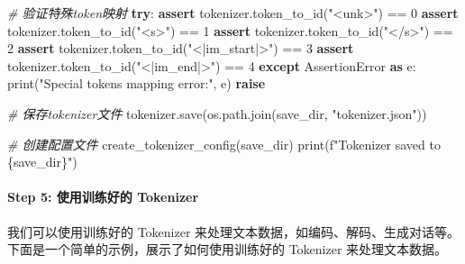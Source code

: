 \documentclass[
]{article}
\newenvironment{Shaded}{}{}
\newcommand{\BuiltInTok}[1]{\textcolor[rgb]{0.00,0.50,0.00}{#1}}
\newcommand{\CommentTok}[1]{\textcolor[rgb]{0.38,0.63,0.69}{\textit{#1}}}
\newcommand{\ControlFlowTok}[1]{\textcolor[rgb]{0.00,0.44,0.13}{\textbf{#1}}}
\newcommand{\DecValTok}[1]{\textcolor[rgb]{0.25,0.63,0.44}{#1}}
\newcommand{\ImportTok}[1]{\textcolor[rgb]{0.00,0.50,0.00}{\textbf{#1}}}
\newcommand{\NormalTok}[1]{#1}
\newcommand{\OperatorTok}[1]{\textcolor[rgb]{0.40,0.40,0.40}{#1}}
\newcommand{\PreprocessorTok}[1]{\textcolor[rgb]{0.74,0.48,0.00}{#1}}
\newcommand{\SpecialCharTok}[1]{\textcolor[rgb]{0.25,0.44,0.63}{#1}}
\newcommand{\SpecialStringTok}[1]{\textcolor[rgb]{0.73,0.40,0.53}{#1}}
\newcommand{\StringTok}[1]{\textcolor[rgb]{0.25,0.44,0.63}{#1}}
\begin{document}
\begin{Shaded}
\begin{Highlighting}[]
    \CommentTok{\# 验证特殊token映射}
    \ControlFlowTok{try}\NormalTok{:}
        \ControlFlowTok{assert}\NormalTok{ tokenizer.token\_to\_id(}\StringTok{"\textless{}unk\textgreater{}"}\NormalTok{) }\OperatorTok{==} \DecValTok{0}
        \ControlFlowTok{assert}\NormalTok{ tokenizer.token\_to\_id(}\StringTok{"\textless{}s\textgreater{}"}\NormalTok{) }\OperatorTok{==} \DecValTok{1}
        \ControlFlowTok{assert}\NormalTok{ tokenizer.token\_to\_id(}\StringTok{"\textless{}/s\textgreater{}"}\NormalTok{) }\OperatorTok{==} \DecValTok{2}
        \ControlFlowTok{assert}\NormalTok{ tokenizer.token\_to\_id(}\StringTok{"\textless{}|im\_start|\textgreater{}"}\NormalTok{) }\OperatorTok{==} \DecValTok{3}
        \ControlFlowTok{assert}\NormalTok{ tokenizer.token\_to\_id(}\StringTok{"\textless{}|im\_end|\textgreater{}"}\NormalTok{) }\OperatorTok{==} \DecValTok{4}
    \ControlFlowTok{except} \PreprocessorTok{AssertionError} \ImportTok{as}\NormalTok{ e:}
        \BuiltInTok{print}\NormalTok{(}\StringTok{"Special tokens mapping error:"}\NormalTok{, e)}
        \ControlFlowTok{raise}

    \CommentTok{\# 保存tokenizer文件}
\NormalTok{    tokenizer.save(os.path.join(save\_dir, }\StringTok{"tokenizer.json"}\NormalTok{))}
    
    \CommentTok{\# 创建配置文件}
\NormalTok{    create\_tokenizer\_config(save\_dir)}
    \BuiltInTok{print}\NormalTok{(}\SpecialStringTok{f"Tokenizer saved to }\SpecialCharTok{\{}\NormalTok{save\_dir}\SpecialCharTok{\}}\SpecialStringTok{"}\NormalTok{)}
\end{Highlighting}
\end{Shaded}

\paragraph{Step 5: 使用训练好的
Tokenizer}\label{step-5-ux4f7fux7528ux8badux7ec3ux597dux7684-tokenizer}

我们可以使用训练好的 Tokenizer
来处理文本数据，如编码、解码、生成对话等。下面是一个简单的示例，展示了如何使用训练好的
Tokenizer 来处理文本数据。
\end{document}
